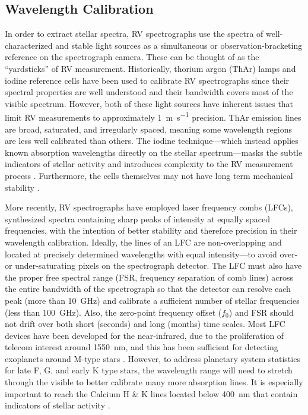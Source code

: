 \subsection{Wavelength Calibration} \label{intro:wvln_cal}

In order to extract stellar spectra, RV spectrographs use the spectra of well-characterized and stable light sources as a simultaneous or observation-bracketing reference on the spectrograph camera. These can be thought of as the ``yardsticks'' of RV measurement. Historically, thorium argon (ThAr) lamps and iodine reference cells have been used to calibrate RV spectrographs since their spectral properties are well understood and their bandwidth covers most of the visible spectrum. However, both of these light sources have inherent issues that limit RV measurements to approximately \SI{1}{\meter\per\second} precision. ThAr emission lines are broad, saturated, and irregularly spaced, meaning some wavelength regions are less well calibrated than others. The iodine technique---which instead applies known absorption wavelengths directly on the stellar spectrum---masks the subtle indicators of stellar activity and introduces complexity to the RV measurement process \citep{spronck_fiber_2015}. Furthermore, the cells themselves may not have long term mechanical stability \citep{fischer_twenty-five_2014}.

More recently, RV spectrographs have employed laser frequency combs (LFCs), synthesized spectra containing sharp peaks of intensity at equally spaced frequencies, with the intention of better stability and therefore precision in their wavelength calibration. Ideally, the lines of an LFC are non-overlapping and located at precisely determined wavelengths with equal intensity---to avoid over- or under-saturating pixels on the spectrograph detector. The LFC must also have the proper free spectral range (FSR, frequency separation of comb lines) across the entire bandwidth of the spectrograph so that the detector can resolve each peak (more than \SI{10}{\giga\hertz}) and calibrate a sufficient number of stellar frequencies (less than \SI{100}{\giga\hertz}). Also, the zero-point frequency offset ($f_0$) and FSR should not drift over both short (seconds) and long (months) time scales. Most LFC devices have been developed for the near-infrared, due to the proliferation of telecom interest around \SI{1550}{\nano\meter}, and this has been sufficient for detecting exoplanets around M-type stars \citep{mahadevan_habitable-zone_2014, fischer_state_2016}. However, to address planetary system statistics for late F, G, and early K type stars, the wavelength range will need to stretch through the visible to better calibrate many more absorption lines. It is especially important to reach the Calcium H \& K lines located below 400~\si{\nano\meter} that contain indicators of stellar activity \citep{isaacson_chromospheric_2010, lovis_harps_2011}.

